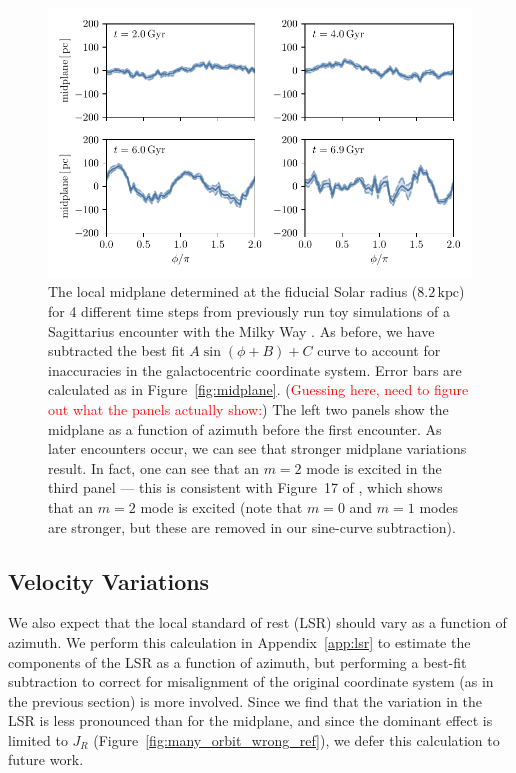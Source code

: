 \documentclass[twocolumn]{aastex62}
\newcommand{\Gus}[1]{\textcolor{red}{#1}}
\newcommand{\kpc}{\text{kpc}}
\begin{document}
\begin{figure}
\begin{center}
\includegraphics[width=5.5in]{fig/midplane_fit_chervinsim.pdf}
\end{center}
\caption{The local midplane determined at the fiducial Solar radius
($8.2\,\kpc$) for 4 different time steps from previously run toy simulations
of a Sagittarius encounter with the Milky Way \citep{2018MNRAS.481..286L}. As
before, we have subtracted the best fit $A\sin{(\phi+B)}+C$ curve to account
for inaccuracies in the galactocentric coordinate system. Error bars are
calculated as in Figure~\ref{fig:midplane}. (\Gus{Guessing here, need to
figure out what the panels actually show:}) The left two panels show the
midplane as a function of azimuth before the first encounter. As later
encounters occur, we can see that stronger midplane variations result. In
fact, one can see that an $m=2$ mode is excited in the third panel --- this is
consistent with Figure~17 of \citet{2018MNRAS.481..286L}, which shows that an
$m=2$ mode is excited (note that $m=0$ and $m=1$ modes are stronger, but these
are removed in our sine-curve subtraction).}
\label{fig:midplane_chervin}
\end{figure}

\subsection{Velocity Variations} \label{ssec:lsr_var}
We also expect that the local standard of rest (LSR) should vary as a function
of azimuth. We perform this calculation in Appendix~\ref{app:lsr} to estimate
the components of the LSR as a function of azimuth, but performing a best-fit
subtraction to correct for misalignment of the original coordinate system (as
in the previous section) is more involved. Since we find that the variation in
the LSR is less pronounced than for the midplane, and since the dominant
effect is limited to $J_R$ (Figure~\ref{fig:many_orbit_wrong_ref}), we defer
this calculation to future work.
\end{document}
